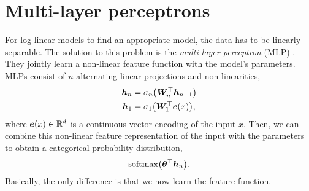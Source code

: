 \section{Multi-layer perceptrons} \label{sec:mlp}

For log-linear models to find an appropriate model, the data has to be linearly
separable. The
solution to this problem is the \textit{multi-layer perceptron}
(MLP) \citep{haykin1994neural}. They jointly learn a non-linear feature function
with the model's parameters. MLPs consist of $n$ alternating linear projections
and non-linearities,
\begin{align*}
    \vec{h}_n & = \sigma_n \lft( \transpose{\mat{W}_n} \vec{h}_{n-1} \rgt) \\
    \bm{h}_1  & = \sigma_1 \lft( \transpose{\mat{W}_1} \vec{e}(x) \rgt),
\end{align*}
where $\bm{e}(x)\in\mathbb{R}^d$ is a continuous vector encoding of the input $x$.
Then, we can combine this non-linear feature representation of the input with
the parameters to obtain a categorical probability distribution, \[
    \text{softmax} \lft( \transpose{\vec{\theta}} \vec{h}_n \rgt).
\]
Basically, the only difference is that we now learn the feature function.


